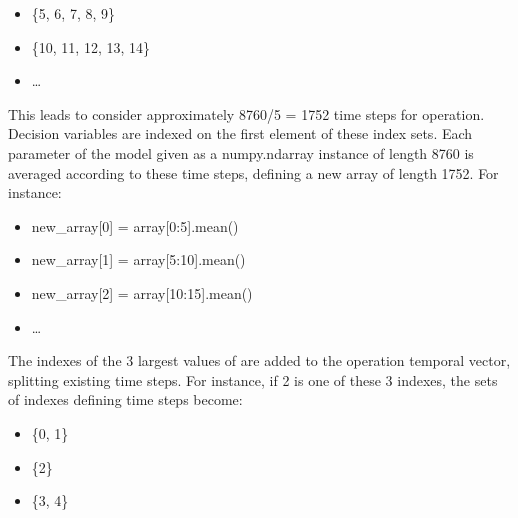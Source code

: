 \documentclass[letterpaper,10pt,english]{sphinxmanual}
\begin{document}
\begin{fulllineitems}
\begin{fulllineitems}
\begin{itemize}
\item {} 
\sphinxAtStartPar
\{5, 6, 7, 8, 9\}

\item {} 
\sphinxAtStartPar
\{10, 11, 12, 13, 14\}

\item {} 
\sphinxAtStartPar
…

\end{itemize}

\sphinxAtStartPar
This leads to consider approximately 8760/5 = 1752 time steps for operation.
Decision variables are indexed on the first element of these index sets.
Each parameter of the model given as a numpy.ndarray instance of length 8760 is averaged according to these time steps,
defining a new array  of length 1752. For instance:
\begin{itemize}
\item {} 
\sphinxAtStartPar
new\_array{[}0{]} = array{[}0:5{]}.mean()

\item {} 
\sphinxAtStartPar
new\_array{[}1{]} = array{[}5:10{]}.mean()

\item {} 
\sphinxAtStartPar
new\_array{[}2{]} = array{[}10:15{]}.mean()

\item {} 
\sphinxAtStartPar
…

\end{itemize}

\begin{sphinxVerbatim}[commandchars=\\\{\}]
 
\end{sphinxVerbatim}

\sphinxAtStartPar
The indexes of the 3 largest values of  are added to the operation temporal vector, splitting existing time steps.
For instance, if 2 is one of these 3 indexes, the sets of indexes defining time steps become:
\begin{itemize}
\item {} 
\sphinxAtStartPar
\{0, 1\}

\item {} 
\sphinxAtStartPar
\{2\}

\item {} 
\sphinxAtStartPar
\{3, 4\}


\end{itemize}
\end{fulllineitems}
\end{fulllineitems}
\end{document}
